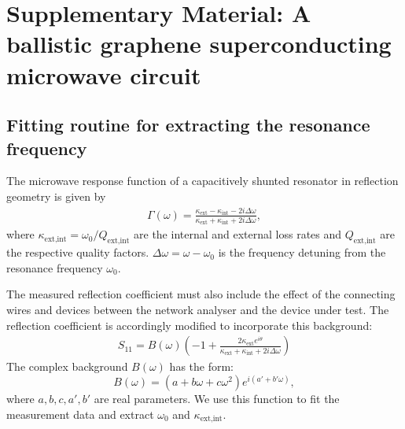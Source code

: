 \clearpage
\section{Supplementary Material: A ballistic graphene superconducting microwave circuit}



\subsection{Fitting routine for extracting the resonance frequency}\label{sec:fitting}
\noindent The microwave response function of a capacitively shunted resonator in reflection geometry is given by~\cite{pozarMicrowaveEngineering2012}
\begin{eqnarray}
\Gamma(\omega) = \frac{\kappa_\text{ext}-\kappa_\text{int}-2i\Delta\omega}{\kappa_\text{ext}+\kappa_\text{int}+2i\Delta\omega},
\end{eqnarray}
where $\kappa_\text{ext,int}=\omega_0/Q_\text{ext,int}$ are the internal and external loss rates and $Q_\text{ext,int}$ are the respective quality factors.
$\Delta\omega=\omega-\omega_0$ is the frequency detuning from the resonance frequency $\omega_0$.

The measured reflection coefficient must also include the effect of the connecting wires and devices between the network analyser and the device under test.
The reflection coefficient is accordingly modified to incorporate this background:
\begin{eqnarray}
S_{11} = B(\omega)\left(-1 + \frac{2\kappa_\text{ext}e^{i\theta}}{\kappa_\text{ext}+\kappa_\text{int}+2i\Delta\omega}\right)
\end{eqnarray}
The complex background $B(\omega)$ has the form:
\begin{equation}
B(\omega) = (a+b\omega+c\omega^2)e^{i(a'+b'\omega)},
\end{equation}
where $a,b,c,a',b'$ are real parameters.  We use this function to fit the measurement data and extract $\omega_0$ and $\kappa_\text{ext,int}$.

